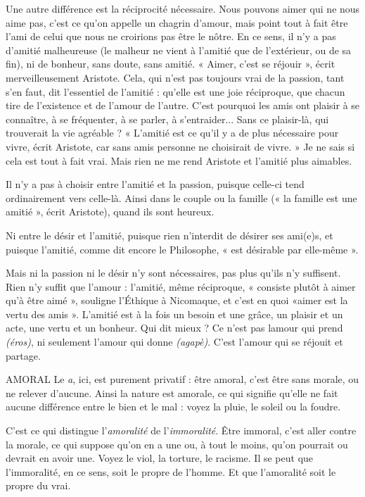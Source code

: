 Une autre différence est la réciprocité nécessaire. Nous pouvons aimer qui
ne nous aime pas, c’est ce qu’on appelle un chagrin d’amour, mais point tout à
fait être l’ami de celui que nous ne croirions pas être le nôtre. En ce sens, il n’y
a pas d’amitié malheureuse (le malheur ne vient à l’amitié que de l'extérieur, ou
de sa fin), ni de bonheur, sans doute, sans amitié. « Aimer, c’est se réjouir »,
écrit merveilleusement Aristote. Cela, qui n’est pas toujours vrai de la passion,
tant s’en faut, dit l'essentiel de l'amitié : qu’elle est une joie réciproque, que
chacun tire de l’existence et de l’amour de l’autre. C’est pourquoi les amis ont
plaisir à se connaître, à se fréquenter, à se parler, à s’entraider... Sans ce plaisir-là,
qui trouverait la vie agréable ? « L'amitié est ce qu’il y a de plus nécessaire
pour vivre, écrit Aristote, car sans amis personne ne choisirait de vivre. » Je ne
sais si cela est tout à fait vrai. Mais rien ne me rend Aristote et l'amitié plus
aimables.

Il n’y a pas à choisir entre l'amitié et la passion, puisque celle-ci tend ordinairement
vers celle-là. Ainsi dans le couple ou la famille (« la famille est une
amitié », écrit Aristote), quand ils sont heureux.

Ni entre le désir et l'amitié, puisque rien n’interdit de désirer ses ami(e)s, et
puisque l'amitié, comme dit encore le Philosophe, « est désirable par elle-même ».

Mais ni la passion ni le désir n’y sont nécessaires, pas plus qu’ils n’y suffisent.
Rien n’y suffit que l’amour : l’amitié, même réciproque, « consiste plutôt
à aimer qu’à être aimé », souligne l’{\it }Éthique à Nicomaque, et c'est en quoi
«aimer est la vertu des amis ». L'amitié est à la fois un besoin et une grâce, un
plaisir et un acte, une vertu et un bonheur. Qui dit mieux ? Ce n'est pas
lamour qui prend {\it (éros)}, ni seulement l'amour qui donne {\it (agapè)}. C'est
l'amour qui se réjouit et partage.

AMORAL Le {\it a}, ici, est purement privatif : être amoral, c’est être sans morale,
ou ne relever d’aucune. Ainsi la nature est amorale, ce qui signifie
qu’elle ne fait aucune différence entre le bien et le mal : voyez la pluie, le soleil
ou la foudre.

C’est ce qui distingue l’{\it amoralité} de l’{\it immoralité}. Être immoral, c’est aller
contre la morale, ce qui suppose qu’on en a une ou, à tout le moins, qu'on
pourrait ou devrait en avoir une. Voyez le viol, la torture, le racisme. Il se peut
que l’immoralité, en ce sens, soit le propre de l’homme. Et que l’amoralité soit
le propre du vrai.

